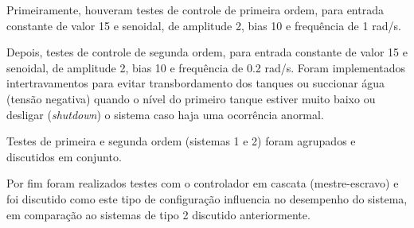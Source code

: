 

Primeiramente, houveram testes de controle de primeira ordem, para entrada constante de valor 15 e senoidal, de amplitude 2, bias 10 e frequência de 1 rad/s.

Depois, testes de controle de segunda ordem, para entrada constante de valor 15 e senoidal, de amplitude 2, bias 10 e frequência de 0.2 rad/s. Foram implementados intertravamentos para evitar transbordamento dos tanques ou succionar água (tensão negativa) quando o nível do primeiro tanque estiver muito baixo ou desligar (\emph{shutdown}) o sistema caso haja uma ocorrência anormal.

Testes de primeira e segunda ordem (sistemas 1 e 2) foram agrupados e discutidos em conjunto.

Por fim foram realizados testes com o controlador em cascata (mestre-escravo) e foi discutido como este tipo de configuração influencia no desempenho do sistema, em comparação ao sistemas de tipo 2 discutido anteriormente.


% 
% 
% 

% 
% 
% 
% 

% 
% 
\newpage
%
% 
